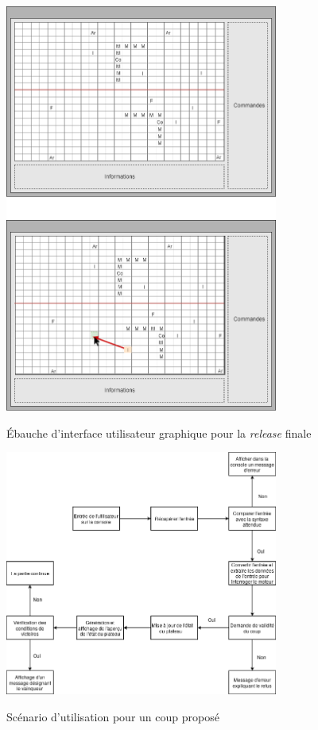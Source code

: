 \documentclass[a4paper]{report}
\begin{document}
\begin{figure}[h]
\caption{\'Ebauche d'interface utilisateur graphique pour la \textit{release} finale}
\centering
\includegraphics[width=0.8\textwidth]{interface_pdp3}
\label{fig:release}
\end{figure}

\begin{figure}[h]
\caption{Scénario d'utilisation pour un coup proposé}
\centering
\includegraphics[width=0.8\textwidth]{scenario}
\label{fig:scenario1}
\end{figure}
\end{document}

